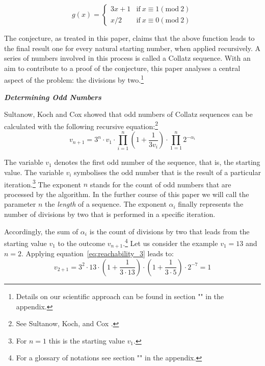 \documentclass{SciPress_2015}
\renewcommand{\subsection}[1]{\textit{\textbf{#1}}}
\begin{document}
\begin{equation}
\label{eq:func_collatz}
g(x)=
\begin{cases}
3x+1	&	\text{if}\ x\equiv 1(\textrm{mod}\ 2)\\
x/2		&	\text{if}\ x\equiv 0(\textrm{mod}\ 2)
\end{cases}
\end{equation}

The conjecture, as treated in this paper, claims that the above function leads to the final result one for every natural starting number, when applied recursively. A series of numbers involved in this process is called a Collatz sequence. With an aim to contribute to a proof of the conjecture, this paper analyses a central aspect of the problem: the divisions by two.\footnote{Details on our scientific approach can be found in section "" in the appendix.}

\vspace{1em}\noindent
\subsection{Determining Odd Numbers}
\par\noindent
Sultanow, Koch and Cox showed that odd numbers of Collatz sequences can be calculated with the following recursive equation:\footnote{See Sultanow, Koch, and Cox \cite[p.~10]{Ref_Sultanow_Koch_Cox_2020}.}
\begin{equation}
\label{eq:reachability_3}
v_{n+1}=3^n\cdot v_1\cdot\prod_{i=1}^{n}\left(1+\frac{1}{3v_{i}}\right)\cdot\prod_{1=1}^{n}2^{-\alpha_i}
\end{equation}

The variable $v_1$ denotes the first odd number of the sequence, that is, the starting value. The variable $v_i$ symbolises the odd number that is the result of a particular iteration.\footnote{For $n=1$ this is the starting value $v_1$.} The exponent $n$ stands for the count of odd numbers that are processed by the algorithm. In the further course of this paper we will call the parameter $n$ the \textit{length} of a sequence. The exponent $\alpha_i$ finally represents the number of divisions by two that is performed in a specific iteration.

\newpage
\par\noindent
Accordingly, the sum of $\alpha_i$ is the count of divisions by two that leads from the starting value $v_1$  to the outcome $v_{n+1}$.\footnote{For a glossary of notations see section "" in the appendix.} Let us consider the example $v_1=13$ and $n=2$. Applying equation~\ref{eq:reachability_3} leads to:
\[
v_{2+1}=3^2\cdot 13\cdot\left(1+\frac{1}{3\cdot13}\right)\cdot\left(1+\frac{1}{3\cdot5}\right)\cdot2^{-7}=1
\]
\end{document}
